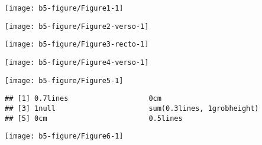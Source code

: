 \documentclass[a3paper,twocolumn]{article}\usepackage[]{graphicx}\usepackage[]{color}
\makeatletter
\newenvironment{kframe}{%
 \def\at@end@of@kframe{}%
 \ifinner\ifhmode%
  \def\at@end@of@kframe{\end{minipage}}%
  \begin{minipage}{\columnwidth}%
 \fi\fi%
 \def\FrameCommand##1{\hskip\@totalleftmargin \hskip-\fboxsep
 \colorbox{shadecolor}{##1}\hskip-\fboxsep
     \hskip-\linewidth \hskip-\@totalleftmargin \hskip\columnwidth}%
 \MakeFramed {\advance\hsize-\width
   \@totalleftmargin\z@ \linewidth\hsize
   \@setminipage}}%
 {\par\unskip\endMakeFramed%
 \at@end@of@kframe}
\newenvironment{knitrout}{}{} %
\makeatother
\begin{document}
\begin{knitrout}
\color{fgcolor}
\texttt{[image: b5-figure/Figure1-1]} 

\end{knitrout}

\begin{knitrout}
\color{fgcolor}
\texttt{[image: b5-figure/Figure2-verso-1]} 

\end{knitrout}

\clearpage
\begin{knitrout}
\color{fgcolor}
\texttt{[image: b5-figure/Figure3-recto-1]} 

\end{knitrout}
\clearpage
\begin{knitrout}
\color{fgcolor}
\texttt{[image: b5-figure/Figure4-verso-1]} 

\end{knitrout}

\clearpage

\begin{knitrout}
\color{fgcolor}
\texttt{[image: b5-figure/Figure5-1]} 

\end{knitrout}

\begin{knitrout}
\color{fgcolor}\begin{kframe}
\begin{verbatim}
## [1] 0.7lines                   0cm                       
## [3] 1null                      sum(0.3lines, 1grobheight)
## [5] 0cm                        0.5lines
\end{verbatim}
\end{kframe}
\end{knitrout}
\clearpage
{}     

\begin{knitrout}
\color{fgcolor}
\texttt{[image: b5-figure/Figure6-1]} 

\end{knitrout}
\end{document}
